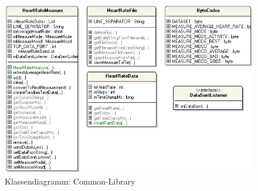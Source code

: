 \bigskip
\begin{figure}[H]
	\centering
	\includegraphics[scale=0.75]{images/classes_common.png}
	\caption{Klassendiagramm: Common-Library}
	\label{fig:classes_common}
\end{figure}
\bigskip

